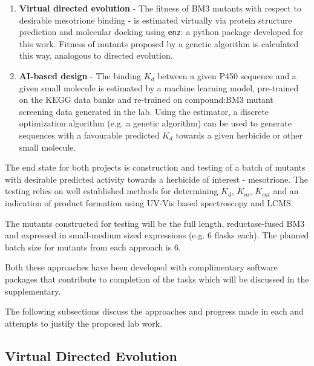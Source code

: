 \documentclass{article}
\begin{document}
\begin{enumerate}
	\item \textbf{Virtual directed evolution} - The fitness of BM3 mutants with respect to desirable mesotrione binding - is estimated virtually via protein structure prediction and molecular docking using \texttt{enz}: a python package developed for this work. Fitness of mutants proposed by a genetic algorithm is calculated this way, analogous to directed evolution. 
	\item \textbf{AI-based design} - The binding $K_d$ between a given P450 sequence and a given small molecule is estimated by a machine learning model, pre-trained on the KEGG data banks and re-trained on compound:BM3 mutant screening data generated in the lab. Using the estimator, a discrete optimization algorithm (e.g. a genetic algorithm) can be used to generate sequences with a favourable predicted $K_d$ towards a given herbicide or other small molecule.
\end{enumerate}

The end state for both projects is construction and testing of a batch of mutants with desirable predicted activity towards a herbicide of interest - mesotrione. 
The testing relies on well established methods for determining $K_d$, $K_m$, $K_{cat}$ and an indication of product formation using UV-Vis based spectroscopy and LCMS. 
\par
The mutants constructed for testing will be the full length, reductase-fused BM3 and expressed in small-medium sized expressions (e.g. 6 flasks each). The planned batch size for mutants from each approach is 6.

Both these approaches have been developed with complimentary software packages that contribute to completion of the tasks which will be discussed in the supplementary.
\par
The following subsections discuss the approaches and progress made in each and attempts to justify the proposed lab work.

\subsection{Virtual Directed Evolution}
\end{document}
